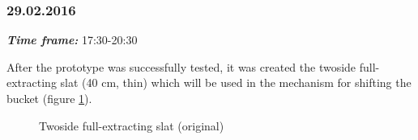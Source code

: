 \subsubsection{29.02.2016}
\textit{\textbf{Time frame:}} 17:30-20:30 

After the prototype was successfully tested, it was created the twoside full-extracting slat (40 cm, thin) which will be used in the mechanism for shifting the bucket (figure \ref{Shiftbuc3.2}). 

\begin{figure}[H]
	\begin{minipage}[h]{1\linewidth}
		\caption{Twoside full-extracting slat (original)}
		\label{Shiftbuc3.2}
	\end{minipage}
\end{figure}
